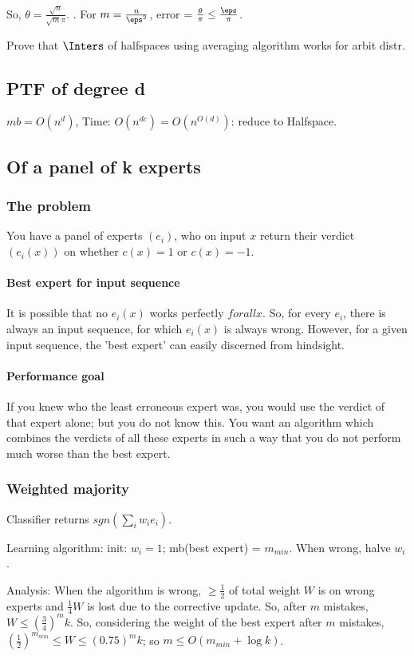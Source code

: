 \documentclass[oneside, article]{memoir}
\begin{document}
So, $\theta = \frac{\sqrt{n}}{\sqrt{m} \pi}$. \chk. For $m = \frac{n}{\eps^{2}}$, error = $\frac{\theta}{\pi} \leq \frac{\eps}{\pi}$.

\oprob Prove that $\Inters$ of halfspaces using averaging algorithm works for arbit distr.

\subsection{PTF of degree d}
$mb = O(n^{d})$, Time: $O(n^{dc}) = O(n^{O(d)})$: reduce to Halfspace.

\subsection{Of a panel of k experts}
\subsubsection{The problem}
You have a panel of experts $(e_{i})$, who on input $x$ return their verdict $(e_{i}(x))$ on whether $c(x) = 1$ or $c(x) = -1$.

\paragraph*{Best expert for input sequence}
It is possible that no $e_i(x)$ works perfectly $forall x$. So, for every $e_i$, there is always an input sequence, for which $e_i(x)$ is always wrong. However, for a given input sequence, the 'best expert' can easily discerned from hindsight.

\paragraph*{Performance goal}
If you knew who the least erroneous expert was, you would use the verdict of that expert alone; but you do not know this. You want an algorithm which combines the verdicts of all these experts in such a way that you do not perform much worse than the best expert.

\subsubsection{Weighted majority}
Classifier returns $sgn(\sum_{i} w_{i}e_{i})$.

Learning algorithm: init: $w_{i} = 1$; mb(best expert) = $m_{min}$. When wrong, halve $w_{i}$.

Analysis: When the algorithm is wrong, $\geq \frac{1}{2}$ of total weight $W$ is on wrong experts and $\frac{1}{4}W$ is lost due to the corrective update. So, after $m$ mistakes, $W \leq (\frac{3}{4})^{m}k$. So, considering the weight of the best expert after $m$ mistakes, $(\frac{1}{2})^{m_{min}} \leq W \leq (0.75)^{m}k$; so $m \leq O(m_{min} + \log k)$.
\end{document}
